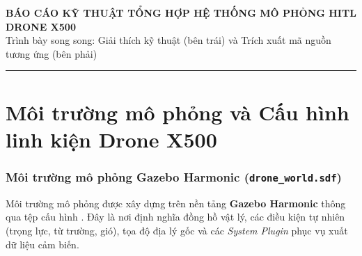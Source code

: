 \documentclass[11pt,a4paper]{article}
\begin{document}
\begin{center}
    {\LARGE\bfseries\color{PrimaryBlue} BÁO CÁO KỸ THUẬT TỔNG HỢP HỆ THỐNG MÔ PHỎNG HITL DRONE X500}\\[0.4em]
    {\normalsize\color{MutedText} Trình bày song song: Giải thích kỹ thuật (bên trái) và Trích xuất mã nguồn tương ứng (bên phải)}
\end{center}
\vspace{0.5em}
\hrule
\vspace{0.5em}

\tableofcontents
\vspace{1em}

\part{Môi trường mô phỏng và Cấu hình linh kiện Drone X500}

\section{Môi trường mô phỏng Gazebo Harmonic (\texttt{drone\_world.sdf})}

Môi trường mô phỏng được xây dựng trên nền tảng \textbf{Gazebo Harmonic} thông qua tệp cấu hình . Đây là nơi định nghĩa đồng hồ vật lý, các điều kiện tự nhiên (trọng lực, từ trường, gió), tọa độ địa lý gốc và các \emph{System Plugin} phục vụ xuất dữ liệu cảm biến.
\end{document}
